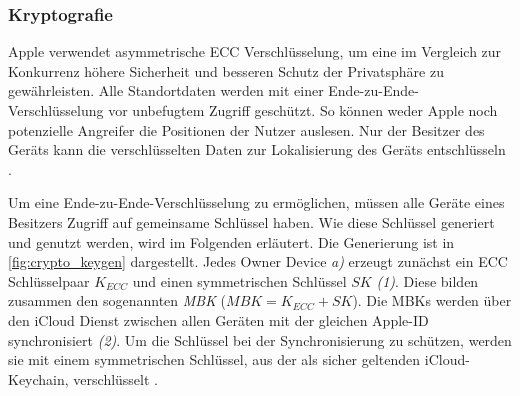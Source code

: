 \subsubsection{Kryptografie}
\label{sec:Kryptografie}
Apple verwendet asymmetrische \ac{ECC} Verschlüsselung, um eine im Vergleich zur Konkurrenz höhere Sicherheit und besseren Schutz der Privatsphäre zu gewährleisten.
Alle Standortdaten werden mit einer Ende-zu-Ende-Verschlüsselung vor unbefugtem Zugriff geschützt.
So können weder Apple noch potenzielle Angreifer die Positionen der Nutzer auslesen.
Nur der Besitzer des Geräts kann die verschlüsselten Daten zur Lokalisierung des Geräts entschlüsseln \cite{Greenberg_FindMyCrypto}.

Um eine Ende-zu-Ende-Verschlüsselung zu ermöglichen, müssen alle Geräte eines Besitzers Zugriff auf gemeinsame Schlüssel haben.
Wie diese Schlüssel generiert und genutzt werden, wird im Folgenden erläutert.
Die Generierung ist in \autoref{fig:crypto_keygen} dargestellt.
Jedes Owner Device \textit{a)} erzeugt zunächst ein \ac{ECC} Schlüsselpaar $K_{ECC}$ und einen symmetrischen Schlüssel $SK$ \textit{(1)}.
Diese bilden zusammen den sogenannten \textit{\ac{MBK}} ($MBK = K_{ECC} + SK$).
Die \acp{MBK} werden über den iCloud Dienst zwischen allen Geräten mit der gleichen Apple-ID synchronisiert \textit{(2)}.
Um die Schlüssel bei der Synchronisierung zu schützen, werden sie mit einem symmetrischen Schlüssel, aus der als sicher geltenden iCloud-Keychain, verschlüsselt \cite{Heinrich_FindMy,Afonin_iCloudKeychain}.
   
